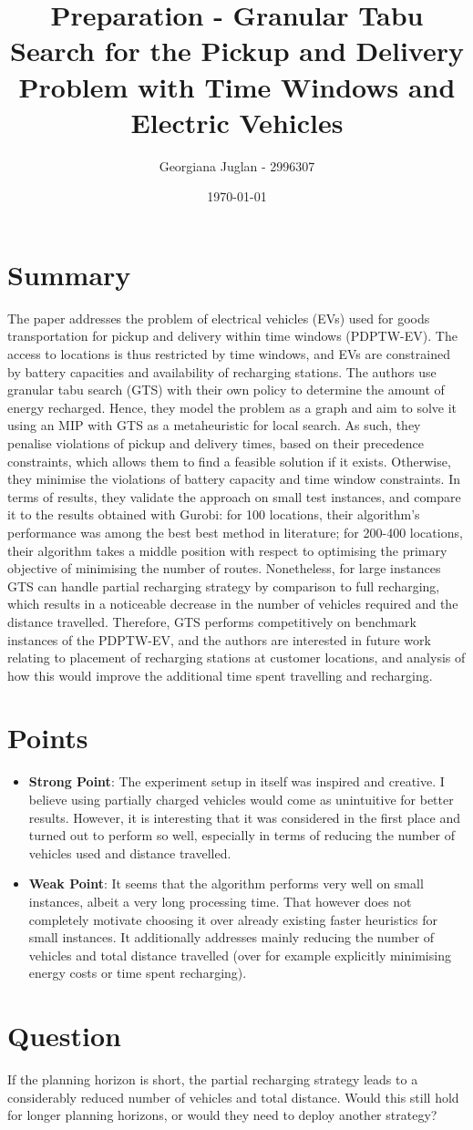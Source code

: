 \documentclass[11pt]{article}
\title{Preparation - Granular Tabu Search for the Pickup and Delivery Problem with Time Windows and Electric Vehicles}
\author{Georgiana Juglan - 2996307}
\date{\today}
\begin{document}
\maketitle

\section{Summary}
The paper addresses the problem of electrical vehicles (EVs) used for goods transportation for pickup and delivery within time windows (PDPTW-EV). The access to locations is thus restricted by time windows, and EVs are constrained by battery capacities and availability of recharging stations. The authors use granular tabu search (GTS) with their own policy to determine the amount of energy recharged. Hence, they model the problem as a graph and aim to solve it using an MIP with GTS as a metaheuristic for local search. As such, they penalise violations of pickup and delivery times, based on their precedence constraints, which allows them to find a feasible solution if it exists. Otherwise, they minimise the violations of battery capacity and time window constraints. In terms of results, they validate the approach on small test instances, and compare it to the results obtained with Gurobi: for 100 locations, their algorithm's performance was among the best best method in literature; for 200-400 locations, their algorithm takes a middle position with respect to optimising the primary objective of minimising the number of routes. Nonetheless, for large instances GTS can handle partial recharging strategy by comparison to full recharging, which results in a noticeable decrease in the number of vehicles required and the distance travelled. Therefore, GTS performs competitively on benchmark instances of the PDPTW-EV, and the authors are interested in future work relating to placement of recharging stations at customer locations, and analysis of how this would improve the additional time spent travelling and recharging.

\section{Points}
    \begin{itemize}
        \item \textbf{Strong Point}: The experiment setup in itself was inspired and creative. I believe using partially charged vehicles would come as unintuitive for better results. However, it is interesting that it was considered in the first place and turned out to perform so well, especially in terms of reducing the number of vehicles used and distance travelled.
        \item \textbf{Weak Point}: It seems that the algorithm performs very well on small instances, albeit a very long processing time. That however does not completely motivate choosing it over already existing faster heuristics for small instances. It additionally addresses mainly reducing the number of vehicles and total distance travelled (over for example explicitly minimising energy costs or time spent recharging).
    \end{itemize}

\section{Question}
If the planning horizon is short, the partial recharging strategy leads to a considerably reduced number of vehicles and total distance. Would this still hold for longer planning horizons, or would they need to deploy another strategy?
\end{document}
